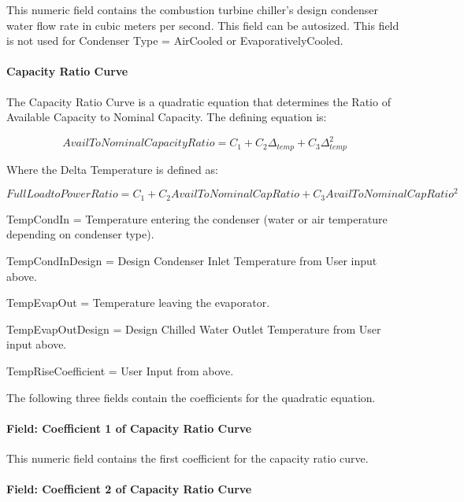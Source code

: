 This numeric field contains the combustion turbine chiller's design condenser water flow rate in cubic meters per second. This field can be autosized. This field is not used for Condenser Type = AirCooled or EvaporativelyCooled.

\paragraph{Capacity Ratio Curve}\label{capacity-ratio-curve-2}

The Capacity Ratio Curve is a quadratic equation that determines the Ratio of Available Capacity to Nominal Capacity. The defining equation is:

\begin{equation}
    AvailToNominalCapacityRatio = {C_1} + {C_2}{\Delta_{temp}} + {C_3}\Delta_{temp}^2
\end{equation}

Where the Delta Temperature is defined as:

\begin{equation}
    FullLoadtoPowerRatio = {C_1} + {C_2}AvailToNominalCapRatio + {C_3}AvailToNominalCapRati{o^2}
\end{equation}

TempCondIn = Temperature entering the condenser (water or air temperature depending on condenser type).

TempCondInDesign = Design Condenser Inlet Temperature from User input above.

TempEvapOut = Temperature leaving the evaporator.

TempEvapOutDesign = Design Chilled Water Outlet Temperature from User input above.

TempRiseCoefficient = User Input from above.

The following three fields contain the coefficients for the quadratic equation.

\paragraph{Field: Coefficient 1 of Capacity Ratio Curve}\label{field-coefficient-1-of-capacity-ratio-curve-2}

This numeric field contains the first coefficient for the capacity ratio curve.

\paragraph{Field: Coefficient 2 of Capacity Ratio Curve}\label{field-coefficient-2-of-capacity-ratio-curve-2}

